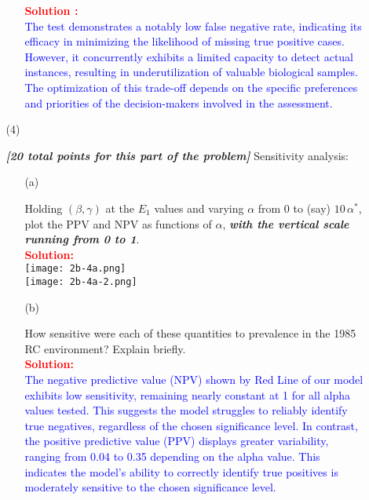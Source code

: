 \documentclass[12pt]{article}
\newcommand{\bi}[1]{\b{\i{#1}}}
\renewcommand{\b}[1]{\textbf{#1}}
\renewcommand{\i}[1]{\textit{#1}}
\begin{document}
\begin{itemize}
\begin{itemize}
\begin{itemize}
\textcolor{red}{\textbf{Solution :}} \\
\textcolor{blue}{The test demonstrates a notably low false negative rate, indicating its efficacy in minimizing the likelihood of missing true positive cases. However, it concurrently exhibits a limited capacity to detect actual instances, resulting in underutilization of valuable biological samples. The optimization of this trade-off depends on the specific preferences and priorities of the decision-makers involved in the assessment.}

\end{itemize}

\item[(4)]

\bi{[20 total points for this part of the problem]} Sensitivity analysis:

\begin{itemize}

\item[(a)]

Holding $( \beta, \gamma )$ at the $E_1$ values and varying $\alpha$ from 0 to (say) $10 \, \alpha^*$, plot the PPV and NPV as functions of $\alpha$, \bi{with the vertical scale running from 0 to 1}. \fbox{\bi{[10 points]}}
\\
\textcolor{red}{\textbf{Solution:}} \\
\texttt{[image: 2b-4a.png]} \\
\texttt{[image: 2b-4a-2.png]}

\item[(b)]

How sensitive were each of these quantities to prevalence in the 1985 RC environment? Explain briefly. \fbox{\bi{[10 points]}} \\
\textcolor{red}{\textbf{Solution:}} \\
\textcolor{blue}{The negative predictive value (NPV) shown by Red Line of our model exhibits low sensitivity, remaining nearly constant at 1 for all alpha values tested. This suggests the model struggles to reliably identify true negatives, regardless of the chosen significance level. In contrast, the positive predictive value (PPV) displays greater variability, ranging from 0.04 to 0.35 depending on the alpha value. This indicates the model's ability to correctly identify true positives is moderately sensitive to the chosen significance level.}


\begin{verbatim}


\end{verbatim}
\end{itemize}
\end{itemize}
\end{itemize}
\end{document}
